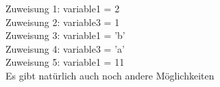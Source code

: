 Zuweisung 1: variable1 = 2 \\
Zuweisung 2: variable3 = 1 \\
Zuweisung 3: variable1 = 'b' \\
Zuweisung 4: variable3 = 'a' \\
Zuweisung 5: variable1 = 11 \\
Es gibt natürlich auch noch andere Möglichkeiten
